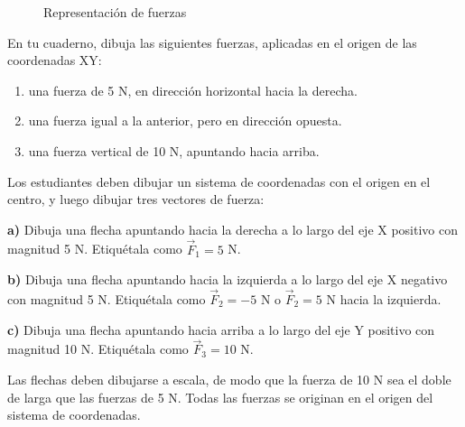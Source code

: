 \begin{figure}[H]
    \centering
    \caption{Representación de fuerzas}
    \label{fig:representacion_fuerzas}
\end{figure}

\begin{exercise}
    En tu cuaderno, dibuja las siguientes fuerzas, aplicadas en el origen de las coordenadas XY:
    \begin{enumerate}[label=\letraminuscula]
        \item una fuerza de 5 N, en dirección horizontal hacia la derecha.
        \item una fuerza igual a la anterior, pero en
        dirección opuesta.
        \item una fuerza vertical de 10 N, apuntando hacia arriba.
    \end{enumerate}
    \begin{solu}
        Los estudiantes deben dibujar un sistema de coordenadas con el origen en el centro, y luego dibujar tres vectores de fuerza:

        \textbf{a)} Dibuja una flecha apuntando hacia la derecha a lo largo del eje X positivo con magnitud 5 N. Etiquétala como $\vec{F}_1 = 5$ N.

        \textbf{b)} Dibuja una flecha apuntando hacia la izquierda a lo largo del eje X negativo con magnitud 5 N. Etiquétala como $\vec{F}_2 = -5$ N o $\vec{F}_2 = 5$ N hacia la izquierda.

        \textbf{c)} Dibuja una flecha apuntando hacia arriba a lo largo del eje Y positivo con magnitud 10 N. Etiquétala como $\vec{F}_3 = 10$ N.

        Las flechas deben dibujarse a escala, de modo que la fuerza de 10 N sea el doble de larga que las fuerzas de 5 N. Todas las fuerzas se originan en el origen del sistema de coordenadas.
    \end{solu}
\end{exercise}


